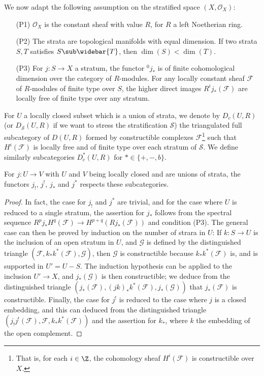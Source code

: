 We now adapt the following assumption on the stratified space $(X,\mathscr{O}_X)$:
\begin{enumerate}[leftmargin=40pt]
    \item[(P1)] $\mathscr{O}_X$ is the constant sheaf with value $R$, for $R$ a left Noetherian ring.
    \item[(P2)] The strata are topological manifolds with equal dimension. If two strata $S,T$ satisfies $S\sub\widebar{T}$, then $\dim(S)<\dim(T)$.
    \item[(P3)] For $j:S\to X$ a stratum, the functor ${^0j_*}$ is of finite cohomological dimension over the category of $R$-modules. For any locally constant sheaf $\mathscr{F}$ of $R$-modules of finite type over $S$, the higher direct images $R^ij_*(\mathscr{F})$ are locally free of finite type over any stratum. 
\end{enumerate}

For $U$ a locally closed subset which is a union of strata, we denote by $D_c(U,R)$ (or $D_\mathcal{S}(U,R)$ if we want to stress the stratification $\mathcal{S}$) the triangulated full subcategory of $D(U,R)$ formed by constructible complexes $\mathscr{F}$\footnote{That is, for each $i\in\Z$, the cohomology sheaf $H^i(\mathscr{F})$ is constructible over $X$.} such that $H^i(\mathscr{F})$ is locally free and of finite type over each stratum of $\mathcal{S}$. We define similarly subcategories $D^*_c(U,R)$ for $*\in\{+,-,b\}$.

\begin{proposition}\label{triangle cat constructible preserve by ! and *}
For $j:U\to V$ with $U$ and $V$ being locally closed and are unions of strata, the functors $j_!$, $j^!$, $j_*$ and $j^*$ respects these subcategories.
\end{proposition}
\begin{proof}
In fact, the case for $j_!$ and $j^*$ are trivial, and for the case where $U$ is reduced to a single stratum, the assertion for $j_*$ follows from the spectral sequence $R^pj_*H^q(\mathscr{F})\to H^{p+q}(Rj_*(\mathscr{F}))$ and condition (P3). The general case can then be proved by induction on the number of strara in $U$: If $k:S\to U$ is the inclusion of an open stratum in $U$, and $\mathscr{G}$ is defined by the distinguished triangle $(\mathscr{F},k_*k^*(\mathscr{F}),\mathscr{G})$, then $\mathscr{G}$ is constructible because $k_*k^*(\mathscr{F})$ is, and is supported in $U'=U-S$. The induction hypothesis can be applied to the inclusion $U'\to X$, and $j_*(\mathscr{G})$ is then constructible; we deduce from the distinguished triangle $(j_*(\mathscr{F}),(jk)_*k^*(\mathscr{F}),j_*(\mathscr{G}))$ that $j_*(\mathscr{F})$ is constructible. Finally, the case for $j^!$ is reduced to the case where $j$ is a closed embedding, and this can deduced from the distinguished triangle $(j_!j^!(\mathscr{F}),\mathscr{F},k_*k^*(\mathscr{F}))$ and the assertion for $k_*$, where $k$ the embedding of the open complement.
\end{proof}

